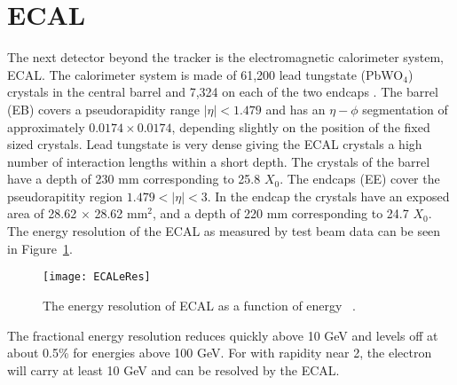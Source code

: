   \section{ECAL}
    The next detector beyond the tracker is the electromagnetic calorimeter 
      system, ECAL.
    The calorimeter system is made of 61,200 lead tungstate (PbWO$_{4}$) 
      crystals in the central barrel and 7,324 on each of the two endcaps 
      \cite{tCmsE}.
    The barrel (EB) covers a pseudorapidity range $|\eta| < 1.479$ and has an
    	$\eta-\phi$ segmentation of approximately $0.0174\times0.0174$, depending
      slightly on the position of the fixed sized crystals.
    Lead tungstate is very dense giving the ECAL crystals a high number of 
      interaction lengths within a short depth.
    The crystals of the barrel have a depth of 230 mm corresponding to 25.8 
    	$X_{0}$.
    The endcaps (EE) cover the pseudorapitity region $1.479 < |\eta| < 3$.
    In the endcap the crystals have an exposed area of 28.62 $\times$ 28.62 
    	mm$^{2}$, and a depth of 220 mm corresponding to 24.7 $X_{0}$.
    The energy resolution of the ECAL as measured by test beam data can be seen in
    	Figure~\ref{ECALeRes}.
    \begin{figure}[!Hhbt]
      \centering
        \texttt{[image: ECALeRes]}
      \caption{The energy resolution of ECAL as a function of energy ~\cite{tCmsE}.}
      \label{ECALeRes}
    \end{figure}
    The fractional energy resolution reduces quickly above 10 GeV and levels
      off at about 0.5\% for energies above 100 GeV. 
    For \JPsi{} with rapidity near 2, the electron will carry at least 10 GeV
      and can be resolved by the ECAL. 

